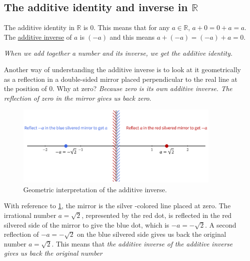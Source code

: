 \documentclass[
  a4paper,
]{article}
\begin{document}
\hypertarget{the-additive-identity-and-inverse-in-mathbbr}{%
\subsection{\texorpdfstring{The additive identity and inverse in
\(\mathbb{R}\)}{The additive identity and inverse in \textbackslash mathbb\{R\}}}\label{the-additive-identity-and-inverse-in-mathbbr}}

The additive identity in \(\mathbb{R}\) is \(0\). This means that for
any \(a \in \mathbb{R}\), \(a + 0 = 0 + a = a\). The
\href{https://en.wikipedia.org/wiki/Additive_inverse}{additive inverse}
of \(a\) is \((-a)\) and this means \(a + (-a) = (-a) + a = 0\).

\emph{When we add together a number and its inverse, we get the additive
identity.}

Another way of understanding the additive inverse is to look at it
geometrically as a reflection in a double-sided mirror placed
perpendicular to the real line at the position of \(0\). Why at zero?
\emph{Because zero is its own additive inverse. The reflection of zero
in the mirror gives us back zero}.

\begin{figure}
\hypertarget{fig:mirror-at-zero}{%
\centering
\includegraphics[width=0.9\textwidth,height=\textheight]{images/mirror-at-zero.png}
\caption{Geometric interpretation of the additive
inverse.}\label{fig:mirror-at-zero}
}
\end{figure}

With reference to \cref{fig:mirror-at-zero}, the mirror is the silver
-colored line placed at zero. The irrational number \(a = \sqrt{2}\),
represented by the red dot, is reflected in the red silvered side of the
mirror to give the blue dot, which is \(-a = -\sqrt{2}\). A second
reflection of \(-a = -\sqrt{2}\) on the blue silvered side gives us back
the original number \(a = \sqrt{2}\). This means that \emph{the additive
inverse of the additive inverse gives us back the original number}
\end{document}
